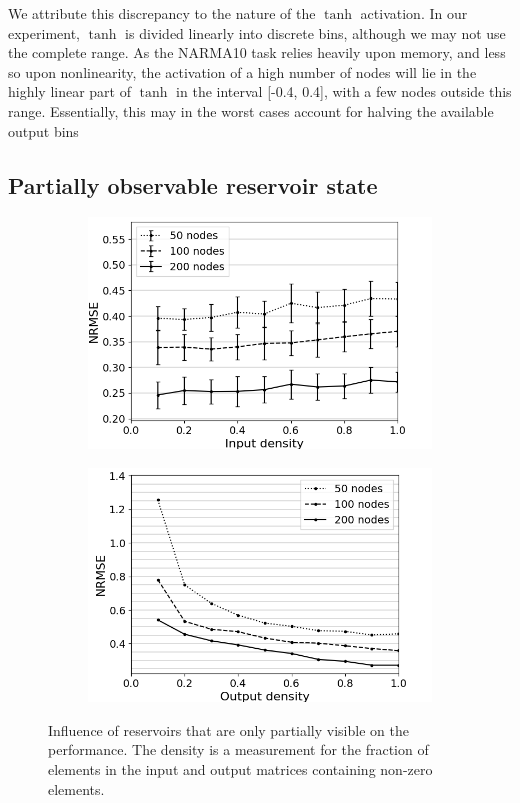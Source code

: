We attribute this discrepancy to the nature of the $\tanh$ activation. In our
experiment, $\tanh$ is divided linearly into discrete bins, although we may not
use the complete range. As the NARMA10 task relies heavily upon memory, and less
so upon nonlinearity, the activation of a high number of nodes will lie in the
highly linear part of $\tanh$ in the interval [-0.4, 0.4], with a few nodes
outside this range. Essentially, this may in the worst cases account for halving
the available output bins

\subsection{Partially observable reservoir state}

\begin{figure}[t!]
  \centering
  \begin{subfigure}{.49\textwidth}
    \centering
    \includegraphics[width=1.0\linewidth]{img/input_density_all.png}
    \caption{}
  \end{subfigure}
  \begin{subfigure}{.49\textwidth}
    \centering
    \includegraphics[width=1.0\linewidth]{img/output_density_all.png}
    \caption{}
  \end{subfigure}
  \caption{
    Influence of reservoirs that are only partially visible on the
performance. The density is a measurement for the fraction of elements in the
input and output matrices containing non-zero elements.
  }
  \label{partial_visibility}
\end{figure}

